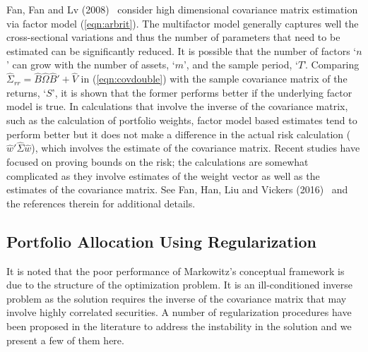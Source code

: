 Fan, Fan and Lv (2008)~\cite{fansq} consider high dimensional covariance matrix estimation via factor model (\ref{eqn:arbrit}). The multifactor model generally captures well the cross-sectional variations and thus the number of parameters that need to be estimated can be significantly reduced. It is possible that the number of factors `$n$' can grow with the number of assets, `$m$', and the sample period, `$T$'. Comparing $\hat{\Sigma}_{rr}= \hat{B} \hat{\Omega} \hat{B}' + \hat{V}$ in (\ref{eqn:covdouble}) with the sample covariance matrix of the returns, `$S$', it is shown that the former performs better if the underlying factor model is true. In calculations that involve the inverse of the covariance matrix, such as the calculation of portfolio weights, factor model based estimates tend to perform better but it does not make a difference in the actual risk calculation ($\hat{w}' \hat{\Sigma} \hat{w}$), which involves the estimate of the covariance matrix. Recent studies have focused on proving bounds on the risk; the calculations are somewhat complicated as they involve estimates of the weight vector as well as the estimates of the covariance matrix. See Fan, Han, Liu and Vickers (2016)~\cite{vickers} and the references therein for additional details.



\subsection{Portfolio Allocation Using Regularization}


It is noted that the poor performance of Markowitz's conceptual framework is due to the structure of the optimization problem. It is an ill-conditioned inverse problem as the solution requires the inverse of the covariance matrix that may involve highly correlated securities. A number of regularization procedures have been proposed in the literature to address the instability in the solution and we present a few of them here. \\


